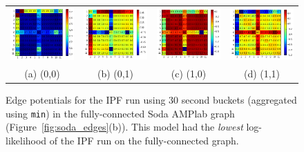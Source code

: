 \begin{figure}
\centering
\begin{tabular}{cccc}
\includegraphics[width=1.3in]{figs/30secmin00fullconf} & \includegraphics[width=1.3in]{figs/30secmin01fullconf} & \includegraphics[width=1.3in]{figs/30secmin10fullconf} & \includegraphics[width=1.3in]{figs/30secmin11fullconf} \\
(a) (0,0) & (b) (0,1) & (c) (1,0) & (d) (1,1) \\[6pt]
\end{tabular}
\caption{Edge potentials for the IPF run using 30 second buckets (aggregated using \texttt{min}) in the fully-connected Soda AMPlab graph (Figure~\ref{fig:soda_edges}(b)). This model had the \emph{lowest} log-likelihood of the IPF run on the fully-connected graph.}
\label{fig:30secminfull}
\end{figure}

